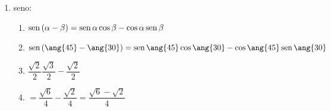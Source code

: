 {\begin{table}[H]
\begin{enumerate}
\begin{enumerate}
\begin{enumerate}
		\end{enumerate}
		\item seno:
		\begin{enumerate}
			\item $\operatorname{sen}\left(\alpha-\beta\right)=\operatorname{sen}\alpha\cos\beta-\cos\alpha\operatorname{sen}\beta$
			\item $\sen\left(\ang{45}-\ang{30}\right)=\sen\ang{45} \cos\ang{30}-\cos\ang{45}\sen\ang{30} $
			\item $\dfrac{\sqrt{2}}{2}\dfrac{\sqrt{3}}{2}-\dfrac{\sqrt{2}}{2}$
			\item $=\dfrac{\sqrt{6}}{4}-\dfrac{\sqrt{2}}{4}=\dfrac{\sqrt{6}-\sqrt{2}}{4}$
		\end{enumerate}
	\end{enumerate}
\end{enumerate}
\end{table}
} %
